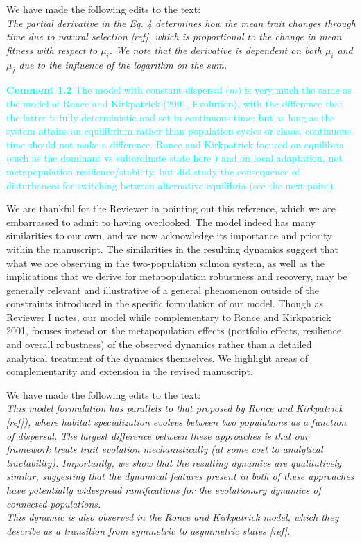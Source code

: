 \documentclass[ucm,12pt]{ucletter}
\begin{document}
\begin{letter}
\noindent We have made the following edits to the text:\\
 \emph{The partial derivative in the Eq. 4 determines how the mean trait changes through time due to natural selection [ref], which is proportional to the change in mean fitness with respect to $\mu_i$.
We note that the derivative is dependent on both $\mu_i$ and $\mu_j$ due to the influence of the logarithm on the sum.}

\noindent \textcolor{cyan}{
{\bf Comment 1.2} The model with constant dispersal ($m$) is very much the same as the model of Ronce and Kirkpatrick (2001, Evolution), with the difference that the latter is fully deterministic and set in continuous time; but as long as the system attains an equilibrium rather than population cycles or chaos, continuous time should not make a difference. Ronce and Kirkpatrick focused on equilibria (such as the dominant vs subordinate state here ) and on local adaptation, not metapopulation resilience/stability, but did study the consequence of disturbances for switching between alternative equilibria (see the next point).
}

 We are thankful for the Reviewer in pointing out this reference, which we are embarrassed to admit to having overlooked. The model indeed has many similarities to our own, and we now acknowledge its importance and priority within the manuscript. The similarities in the resulting dynamics suggest that what we are observing in the two-population salmon system, as well as the implications that we derive for metapopulation robustness and recovery, may be generally relevant and illustrative of a general phenomenon outside of the constraints introduced in the specific formulation of our model. Though as Reviewer I notes, our model while complementary to Ronce and Kirkpatrick 2001, focuses instead on the metapopulation effects (portfolio effects, resilience, and overall robustness) of the observed dynamics rather than a detailed analytical treatment of the dynamics themselves. We highlight areas of complementarity and extension in the revised manuscript.

\noindent We have made the following edits to the text:\\
 \emph{This model formulation has parallels to that proposed by Ronce and Kirkpatrick [ref]), where habitat specialization evolves between two populations as a function of dispersal.
The largest difference between these approaches is that our framework treats trait evolution mechanistically (at some cost to analytical tractability).
Importantly, we show that the resulting dynamics are qualitatively similar, suggesting that the dynamical features present in both of these approaches have potentially widespread ramifications for the evolutionary dynamics of connected populations.}\\
 \emph{This dynamic is also observed in the Ronce and Kirkpatrick model, which they describe as a transition from symmetric to asymmetric states [ref].}



\end{letter}
\end{document}

